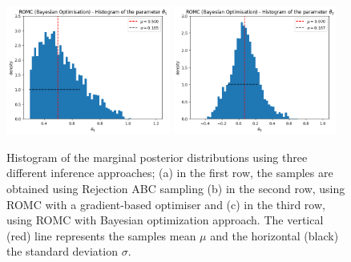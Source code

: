 \begin{figure}[H]
\begin{center}
      \includegraphics[width=0.48\textwidth]{./latex_files/images/chapter4/mae2_hist_t1_romc_bo.png}
      \includegraphics[width=0.48\textwidth]{./latex_files/images/chapter4/mae2_hist_t2_romc_bo.png}\\
    \end{center}
    \caption[MA2 example, evaluation of the marginal
    distributions.]{Histogram of the marginal posterior distributions
      using three different inference approaches; (a) in the first
      row, the samples are obtained using Rejection ABC sampling (b)
      in the second row, using ROMC with a gradient-based optimiser
      and (c) in the third row, using ROMC with Bayesian optimization
      approach. The vertical (red) line represents the samples mean
      $\mu$ and the horizontal (black) the standard deviation
      $\sigma$.}
  \label{fig:ma2_3}
\end{figure}



